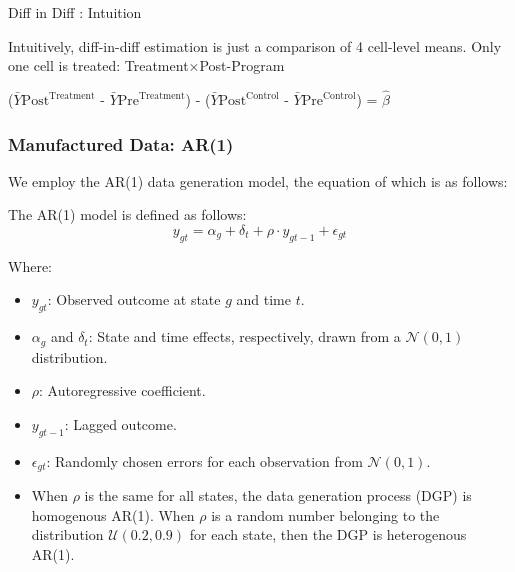 \documentclass[11pt, aspectratio=169]{beamer}
\begin{document}
\begin{frame}{Diff in Diff : Intuition}

Intuitively, diff-in-diff estimation is just a comparison of 4 cell-level means. Only one cell is treated: Treatment×Post-Program
        \begin{center}
            ($\bar{Y}{\text{Post}}^{\text{Treatment}}$ - $\bar{Y}{\text{Pre}}^{\text{Treatment}}$) - ($\bar{Y}{\text{Post}}^{\text{Control}}$ - $\bar{Y}{\text{Pre}}^{\text{Control}}$)  = $\hat{\beta}$
        \end{center}
    
        \begin{center}
        \end{center}
    
\end{frame}


\begin{frame}[t]
    \frametitle{Manufactured Data: AR(1)}

    We employ the AR(1) data generation model, the equation of which is as follows:

    The AR(1) model is defined as follows:
    \[
    y_{gt} = \alpha_g + \delta_t + \rho \cdot y_{gt-1} + \epsilon_{gt}
    \]
    
    Where:
    \begin{itemize}
        \item $y_{gt}$: Observed outcome at state $g$ and time $t$.
        \item $\alpha_g$ and $\delta_t$: State and time effects, respectively, drawn from a $\mathcal{N}(0,1)$ distribution.
        \item $\rho$: Autoregressive coefficient.
        \item $y_{gt-1}$: Lagged outcome.
        \item $\epsilon_{gt}$: Randomly chosen errors for each observation from $\mathcal{N}(0,1)$.
        \item When $\rho$ is the same for all states, the data generation process (DGP) is homogenous AR(1). When $\rho$ is a random number belonging to the distribution $\mathcal{U}(0.2, 0.9)$ for each state, then the DGP is heterogenous AR(1).
    \end{itemize}
\end{frame}
\end{document}
